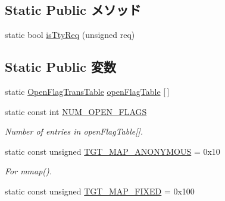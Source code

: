 \subsection*{Static Public メソッド}
\begin{DoxyCompactItemize}
\item 
static bool \hyperlink{classAlphaTru64_ab20bdd4422ecf6e1736a5587be296b3f}{isTtyReq} (unsigned req)
\end{DoxyCompactItemize}
\subsection*{Static Public 変数}
\begin{DoxyCompactItemize}
\item 
static \hyperlink{structOpenFlagTransTable}{OpenFlagTransTable} \hyperlink{classAlphaTru64_ab1db5a531609b99b262cc849ea24765a}{openFlagTable} \mbox{[}$\,$\mbox{]}
\item 
static const int \hyperlink{classAlphaTru64_ad85b9918c8f2c8739537a002dc1dc526}{NUM\_\-OPEN\_\-FLAGS}
\begin{DoxyCompactList}\small\item\em Number of entries in openFlagTable\mbox{[}\mbox{]}. \item\end{DoxyCompactList}\item 
static const unsigned \hyperlink{classAlphaTru64_a0bbc267200567dd98250b99b6085a499}{TGT\_\-MAP\_\-ANONYMOUS} = 0x10
\begin{DoxyCompactList}\small\item\em For mmap(). \item\end{DoxyCompactList}\item 
static const unsigned \hyperlink{classAlphaTru64_a0124e421d7846143bca15728b7a53e14}{TGT\_\-MAP\_\-FIXED} = 0x100
\end{DoxyCompactItemize}

